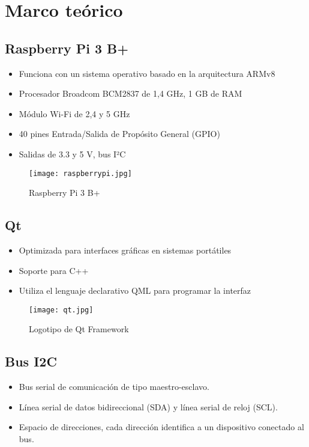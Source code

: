 \section{Marco teórico}

\subsection*{Raspberry Pi 3 B+}
\begin{itemize}
	\item Funciona con un sistema operativo basado en la arquitectura ARMv8
	\item Procesador Broadcom BCM2837 de 1,4 GHz, 1 GB de RAM
	\item Módulo Wi-Fi de 2,4 y 5 GHz
	\item 40 pines Entrada/Salida de Propósito General (GPIO)
	\item Salidas de 3.3 y 5 V, bus I²C
\end{itemize}

\begin{figure}[htb]
	\centering
	\texttt{[image: raspberrypi.jpg]}
	\caption{Raspberry Pi 3 B+}
\end{figure}

\subsection*{Qt}
\begin{itemize}
	\item Optimizada para interfaces gráficas en sistemas portátiles
	\item Soporte para C++
	\item Utiliza el lenguaje declarativo QML para programar la interfaz
\end{itemize}

\begin{figure}[htb]
	\centering
	\texttt{[image: qt.jpg]}
	\caption{Logotipo de Qt Framework}
\end{figure}

\subsection*{Bus I2C}
\begin{itemize}
	\item Bus serial de comunicación de tipo maestro-esclavo.
	\item Línea serial de datos bidireccional (SDA)  y línea serial de reloj (SCL).
	\item Espacio de direcciones, cada dirección identifica a un dispositivo conectado al bus.
\end{itemize}

